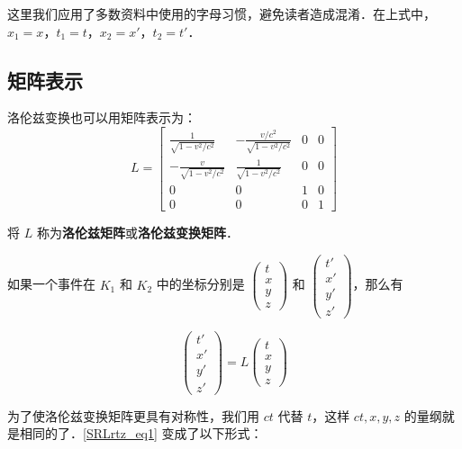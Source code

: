 这里我们应用了多数资料中使用的字母习惯，避免读者造成混淆．在上式中，$x_1=x$，$t_1=t$，$x_2=x'$，$t_2=t'$．

\subsection{矩阵表示}

洛伦兹变换也可以用矩阵表示为：
\begin{equation}\label{SRLrtz_eq4}
L=
\left[\begin{matrix}
\frac{1}{\sqrt{1-v^2/c^2}}& -\frac{v/c^2}{\sqrt{1-v^2/c^2}}& 0& 0\\
-\frac{v}{\sqrt{1-v^2/c^2}}& \frac{1}{\sqrt{1-v^2/c^2}}& 0& 0\\
0&0&1&0\\
0&0&0&1
\end{matrix}\right]
\end{equation}

将 $L$ 称为\textbf{洛伦兹矩阵}或\textbf{洛伦兹变换矩阵}．

如果一个事件在 $K_1$ 和 $K_2$ 中的坐标分别是 $\left(\begin{matrix}   t\\x\\y\\z    \end{matrix}\right)$ 和 $\left(\begin{matrix}   t'\\x'\\y'\\z'    \end{matrix}\right)$，那么有

\begin{equation}
\left(\begin{matrix}   t'\\x'\\y'\\z'    \end{matrix}\right)
=
L
\left(\begin{matrix}   t\\x\\y\\z    \end{matrix}\right)
\end{equation}

为了使洛伦兹变换矩阵更具有对称性，我们用 $ct$ 代替 $t$，这样 $ct,x,y,z$ 的量纲就是相同的了．\autoref{SRLrtz_eq1} 变成了以下形式：

